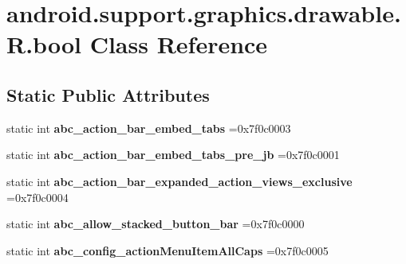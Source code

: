 \hypertarget{classandroid_1_1support_1_1graphics_1_1drawable_1_1R_1_1bool}{}\section{android.\+support.\+graphics.\+drawable.\+R.\+bool Class Reference}
\label{classandroid_1_1support_1_1graphics_1_1drawable_1_1R_1_1bool}
\subsection*{Static Public Attributes}
\begin{DoxyCompactItemize}
\item 
\mbox{\label{classandroid_1_1support_1_1graphics_1_1drawable_1_1R_1_1bool_af22c954035723f0321c35e627eb90eb5}} 
static int {\bfseries abc\+\_\+action\+\_\+bar\+\_\+embed\+\_\+tabs} =0x7f0c0003
\item 
\mbox{\label{classandroid_1_1support_1_1graphics_1_1drawable_1_1R_1_1bool_aabbf48125c367e97fdb9c8d3a981070b}} 
static int {\bfseries abc\+\_\+action\+\_\+bar\+\_\+embed\+\_\+tabs\+\_\+pre\+\_\+jb} =0x7f0c0001
\item 
\mbox{\label{classandroid_1_1support_1_1graphics_1_1drawable_1_1R_1_1bool_a36b5f1d1c6e054cf5a211b60b4609f25}} 
static int {\bfseries abc\+\_\+action\+\_\+bar\+\_\+expanded\+\_\+action\+\_\+views\+\_\+exclusive} =0x7f0c0004
\item 
\mbox{\label{classandroid_1_1support_1_1graphics_1_1drawable_1_1R_1_1bool_a6a350ccf00a9318ce3f6173b0e329176}} 
static int {\bfseries abc\+\_\+allow\+\_\+stacked\+\_\+button\+\_\+bar} =0x7f0c0000
\item 
\mbox{\label{classandroid_1_1support_1_1graphics_1_1drawable_1_1R_1_1bool_a15473cf8350349ea92b6dc3c4123fd09}} 
static int {\bfseries abc\+\_\+config\+\_\+action\+Menu\+Item\+All\+Caps} =0x7f0c0005
\item 
\mbox{\label{classandroid_1_1support_1_1graphics_1_1drawable_1_1R_1_1bool_a81e465175ee9522d3176c8dc05fef73b}} 

\end{DoxyCompactItemize}
